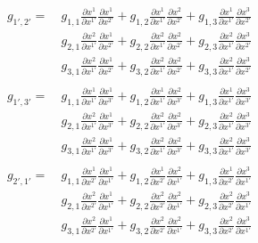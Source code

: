 \documentclass[9pt]{report}
\begin{document}
  \[
    \begin{align*}
    g_{1', 2'} =
     &\ g_{1,1}\frac{\partial x^1}{\partial x^{1'}}\frac{\partial x^1}{\partial x^{2'}}
    +g_{1,2}\frac{\partial x^1}{\partial x^{1'}}\frac{\partial x^2}{\partial x^{2'}}
    +g_{1,3}\frac{\partial x^1}{\partial x^{1'}}\frac{\partial x^3}{\partial x^{2'}}\\
    &\
     g_{2,1}\frac{\partial x^2}{\partial x^{1'}}\frac{\partial x^1}{\partial x^{2'}}
    +g_{2,2}\frac{\partial x^2}{\partial x^{1'}}\frac{\partial x^2}{\partial x^{2'}}
    +g_{2,3}\frac{\partial x^2}{\partial x^{1'}}\frac{\partial x^3}{\partial x^{2'}}\\
    &\
     g_{3,1}\frac{\partial x^2}{\partial x^{1'}}\frac{\partial x^1}{\partial x^{2'}}
    +g_{3,2}\frac{\partial x^2}{\partial x^{1'}}\frac{\partial x^2}{\partial x^{2'}}
    +g_{3,3}\frac{\partial x^2}{\partial x^{1'}}\frac{\partial x^3}{\partial x^{2'}}\\
    \end{align*}
  \]
  \[
    \begin{align*}
    g_{1', 3'} =
     &\ g_{1,1}\frac{\partial x^1}{\partial x^{1'}}\frac{\partial x^1}{\partial x^{3'}}
    +g_{1,2}\frac{\partial x^1}{\partial x^{1'}}\frac{\partial x^2}{\partial x^{3'}}
    +g_{1,3}\frac{\partial x^1}{\partial x^{1'}}\frac{\partial x^3}{\partial x^{3'}}\\
    &\
     g_{2,1}\frac{\partial x^2}{\partial x^{1'}}\frac{\partial x^1}{\partial x^{3'}}
    +g_{2,2}\frac{\partial x^2}{\partial x^{1'}}\frac{\partial x^2}{\partial x^{3'}}
    +g_{2,3}\frac{\partial x^2}{\partial x^{1'}}\frac{\partial x^3}{\partial x^{3'}}\\
    &\
     g_{3,1}\frac{\partial x^2}{\partial x^{1'}}\frac{\partial x^1}{\partial x^{3'}}
    +g_{3,2}\frac{\partial x^2}{\partial x^{1'}}\frac{\partial x^2}{\partial x^{3'}}
    +g_{3,3}\frac{\partial x^2}{\partial x^{1'}}\frac{\partial x^3}{\partial x^{3'}}\\
    \end{align*}
  \]
    \begin{align*}
    g_{2', 1'} =\
     &g_{1,1}\frac{\partial x^1}{\partial x^{2'}}\frac{\partial x^1}{\partial x^{1'}}
    +g_{1,2}\frac{\partial x^1}{\partial x^{2'}}\frac{\partial x^2}{\partial x^{1'}}
    +g_{1,3}\frac{\partial x^1}{\partial x^{2'}}\frac{\partial x^3}{\partial x^{1'}}\\
    &
     g_{2,1}\frac{\partial x^2}{\partial x^{2'}}\frac{\partial x^1}{\partial x^{1'}}
    +g_{2,2}\frac{\partial x^2}{\partial x^{2'}}\frac{\partial x^2}{\partial x^{1'}}
    +g_{2,3}\frac{\partial x^2}{\partial x^{2'}}\frac{\partial x^3}{\partial x^{1'}}\\
    &
     g_{3,1}\frac{\partial x^2}{\partial x^{2'}}\frac{\partial x^1}{\partial x^{1'}}
    +g_{3,2}\frac{\partial x^2}{\partial x^{2'}}\frac{\partial x^2}{\partial x^{1'}}
    +g_{3,3}\frac{\partial x^2}{\partial x^{2'}}\frac{\partial x^3}{\partial x^{1'}}\\
    \end{align*}
\end{document}
